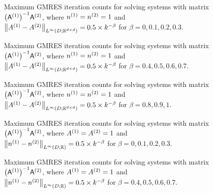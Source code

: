     \begin{figure}
      \centering

  \caption[Maximum GMRES iteration counts when $\NLiDRRdtd{\Aso-\Ast} = 0.5\times  k^{-\beta}$ for $\beta = 0,0.1,0.2,0.3.$]{Maximum GMRES iteration counts for solving systems with matrix $\AmatoI\Amatt$, where ${n}^{(1)}={n}^{(2)}=1$ and $\NLiDRRdtd{\Aso-\Ast} = 0.5\times  k^{-\beta}$ for $\beta = 0,0.1,0.2,0.3.$}\label{fig:linfinityA0}
    \end{figure}
    
    \begin{figure}
      \centering

   \caption[Maximum GMRES iteration counts when $\NLiDRRdtd{\Aso-\Ast} = 0.5\times  k^{-\beta}$ for $\beta = 0.4,0.5,0.6,0.7.$]{Maximum GMRES iteration counts for solving systems with matrix $\AmatoI\Amatt$, where ${n}^{(1)}={n}^{(2)}=1$ and $\NLiDRRdtd{\Aso-\Ast} = 0.5\times  k^{-\beta}$ for $\beta = 0.4,0.5 ,0.6,0.7.$}\label{fig:linfinityA1}
\end{figure}

    \begin{figure}
      \centering

    \caption[Maximum GMRES iteration counts when $\NLiDRRdtd{\Aso-\Ast} = 0.5\times  k^{-\beta}$ for $\beta = 0.8,0.9,1.$]{Maximum GMRES iteration counts for solving systems with matrix $\AmatoI\Amatt$, where ${n}^{(1)}={n}^{(2)}=1$ and $\NLiDRRdtd{\Aso-\Ast} = 0.5\times  k^{-\beta}$ for $\beta = 0.8,0.9,1.$}\label{fig:linfinityA2}
\end{figure}

    \begin{figure}
      \centering

  \caption[Maximum GMRES iteration counts when $\NLiDRR{\nso-\nst} = 0.5\times  k^{-\beta}$ for $\beta = 0,0.1,0.2,0.3.$]{Maximum GMRES iteration counts for solving systems with matrix $\AmatoI\Amatt$, where ${A}^{(1)}={A}^{(2)}=1$ and $\NLiDRR{\nso-\nst} = 0.5\times  k^{-\beta}$ for $\beta = 0,0.1,0.2,0.3.$}\label{fig:linfinityn0}
    \end{figure}
    
    \begin{figure}
      \centering

   \caption[Maximum GMRES iteration counts when $\NLiDRR{\nso-\nst} = 0.5\times  k^{-\beta}$ for $\beta = 0.4,0.5,0.6,0.7.$]{Maximum GMRES iteration counts for solving systems with matrix $\AmatoI\Amatt$, where ${A}^{(1)}={A}^{(2)}=1$ and $\NLiDRR{\nso-\nst} = 0.5\times  k^{-\beta}$ for $\beta = 0.4,0.5,0.6,0.7.$}\label{fig:linfinityn1}
\end{figure}

